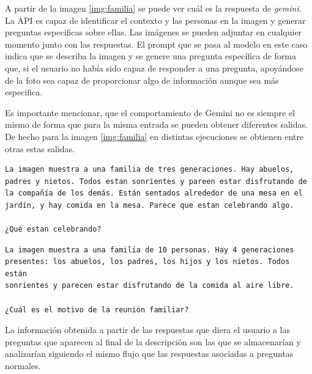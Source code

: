 A partir de la imagen \ref{img:familia} se puede ver cuál es la respuesta de \textit{gemini}. La API es capaz de identificar el contexto y las personas en la imagen y generar preguntas especificas sobre ellas. Las imágenes se pueden adjuntar en cualquier momento junto con las respuestas. El prompt que se pasa al modelo en este caso indica que se describa la imagen y se genere una pregunta específica de forma que, si el usuario no había sido capaz de responder a una pregunta, apoyándose de la foto sea capaz de proporcionar algo de información aunque sea más especifica. 

Es importante mencionar, que el comportamiento de Gemini no es siempre el mismo de forma que para la misma entrada se pueden obtener diferentes salidas. De hecho para la imagen \ref{img:familia} en distintas ejecuciones se obtienen entre otras estas salidas. 

\begin{verbatim}
La imagen muestra a una familia de tres generaciones. Hay abuelos,
padres y nietos. Todos estan sonrientes y pareen estar disfrutando de
la compañía de los demás. Están sentados alrededor de una mesa en el
jardín, y hay comida en la mesa. Parece que estan celebrando algo. 
   
¿Qué estan celebrando? 
\end{verbatim}

\begin{verbatim}
La imagen muestra a una familia de 10 personas. Hay 4 generaciones
presentes: los abuelos, los padres, los hijos y los nietos. Todos están
sonrientes y parecen estar disfrutando de la comida al aire libre. 

¿Cuál es el motivo de la reunión familiar?  
\end{verbatim}

La información obtenida a partir de las respuestas que diera el usuario a las preguntas que aparecen al final de la descripción son las que se almacenarían y analizarían siguiendo el mismo flujo que las respuestas asociadas a preguntas normales. 

